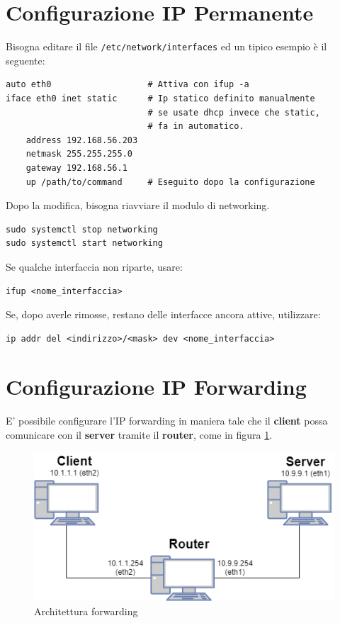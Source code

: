 \documentclass[a4paper]{report}
\newenvironment{ricordati}{\begin{tcolorbox}[fonttitle=\sffamily\bfseries\large,title=Ricordati,colframe=orange!75!white]}{\end{tcolorbox}}
\newenvironment{code}{\begin{tcolorbox}[size=small]}{\end{tcolorbox}}
\begin{document}
\section{Configurazione IP Permanente}

Bisogna editare il file \texttt{/etc/network/interfaces} ed un tipico esempio è il seguente:

\begin{code}
\begin{lstlisting}
auto eth0                   # Attiva con ifup -a
iface eth0 inet static      # Ip statico definito manualmente
                            # se usate dhcp invece che static,
                            # fa in automatico.
    address 192.168.56.203  
    netmask 255.255.255.0
    gateway 192.168.56.1
    up /path/to/command     # Eseguito dopo la configurazione
\end{lstlisting}
\end{code}

\begin{ricordati}
Dopo la modifica, bisogna riavviare il modulo di networking.
\begin{lstlisting}
sudo systemctl stop networking
sudo systemctl start networking
\end{lstlisting}

Se qualche interfaccia non riparte, usare:
\begin{lstlisting}
ifup <nome_interfaccia>
\end{lstlisting}

Se, dopo averle rimosse, restano delle interfacce ancora attive, utilizzare:
\begin{lstlisting}
ip addr del <indirizzo>/<mask> dev <nome_interfaccia>
\end{lstlisting}
\end{ricordati}

\section{Configurazione IP Forwarding}

E' possibile configurare l'IP forwarding in maniera tale che il \textbf{client} possa comunicare con il \textbf{server} tramite il \textbf{router}, come in figura \ref{fig:forwarding}.

\begin{figure}
	\centering
	\includegraphics[width=0.7\linewidth]{forwarding}
	\caption{Architettura forwarding}
	\label{fig:forwarding}
\end{figure}
\end{document}
